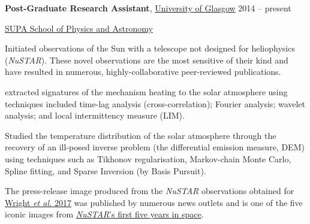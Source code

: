 \documentclass[11pt]{article}
\newcommand{\makeheading}[2][]%
        {\hspace*{-\marginparsep minus \marginparwidth}%
         \begin{minipage}[t]{\textwidth+\marginparwidth+\marginparsep}%
             {\large \bfseries #2 \hfill #1}\\[-0.15\baselineskip]%
                 \rule{\columnwidth}{1pt}%
         \end{minipage}}
\renewcommand{\section}[1]{\pagebreak[3]%
    \vspace{1.3\baselineskip}%
    \phantomsection\addcontentsline{toc}{section}{#1}%
    \noindent\llap{\scshape\smash{\parbox[t]{\marginparwidth}{\hyphenpenalty=10000\raggedright #1}}}%
    \vspace{-\baselineskip}\par}
\begin{document}
 \textbf{Post-Graduate Research Assistant},
            \href{http://www.gla.ac.uk/}{University of Glasgow}
            \hfill {2014 -- present}
\begin{innerlist}

    \item[] \href{http://www.astro.gla.ac.uk/}{SUPA School of Physics and Astronomy}
    \begin{innerlist}
    	\item{} Initiated observations of the Sun with a telescope not designed for heliophysics ({\it NuSTAR}). These novel observations are the most sensitive of their kind and have resulted in numerous, highly-collaborative peer-reviewed publications.
    	\item{} extracted signatures of the mechanism heating to the solar atmosphere using techniques included time-lag analysis (cross-correlation); Fourier analysis; wavelet analysis; and local intermittency measure (LIM).
    	\item{} Studied the temperature distribution of the solar atmosphere through the recovery of an ill-posed inverse problem (the differential emission measure, DEM) using techniques such as Tikhonov regularisation, Markov-chain Monte Carlo, Spline fitting, and Sparse Inversion (by Basis Pursuit).
%
         \item{} The press-release image produced from the {\it NuSTAR} observations obtained for \href{https://doi.org/10.3847/1538-4357/aa7a59}{Wright {\it et al.} 2017} was published by numerous news outlets and is one of the five iconic images from \href{https://www.nasa.gov/feature/jpl/nustars-first-five-years-in-space}{{\it NuSTAR}'s first five years in space}.
    \end{innerlist}
\end{innerlist}
\end{document}
